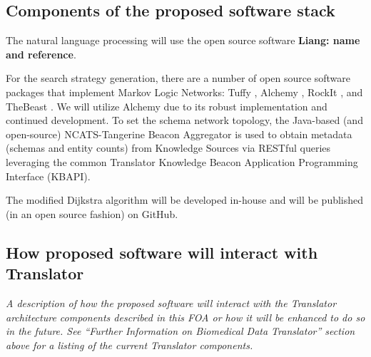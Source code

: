 \documentclass[11pt,notitlepage]{article}
\begin{document}
\subsection{Components of the proposed software stack}
The natural language processing will use the open source software \textbf{Liang: name and reference}.

 For the search strategy generation, there are a number of open source software packages that implement Markov Logic Networks: Tuffy \cite{DBLP:journals/pvldb/NiuRDS11}, Alchemy \cite{kok2006alchemy}, RockIt \cite{noessner2013rockit}, and TheBeast \cite{riedel08improving}. We will utilize Alchemy due to its robust implementation and continued development. To set the schema network topology, the Java-based (and open-source) NCATS-Tangerine Beacon Aggregator is used to obtain metadata (schemas and entity counts) from Knowledge Sources via RESTful queries leveraging the common Translator Knowledge Beacon Application Programming Interface (KBAPI).
 
 The modified Dijkstra algorithm will be developed in-house and will be published (in an open source fashion) on GitHub.


\subsection{How proposed software will interact with Translator}
\textit{A description of how the proposed software will interact with the Translator architecture
components described in this FOA or how it will be enhanced to do so in the future. See
“Further Information on Biomedical Data Translator” section above for a listing of the
current Translator components.}
\end{document}
